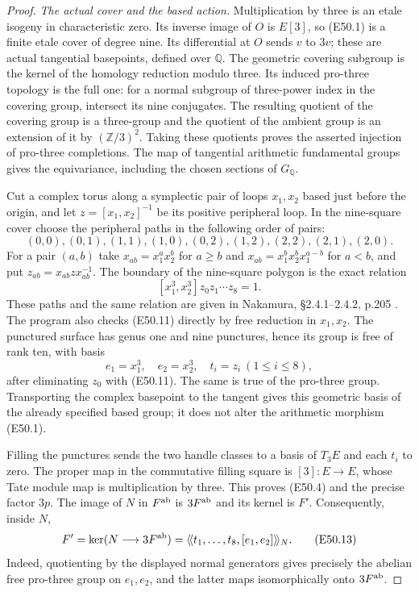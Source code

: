 \begin{proof}
\emph{The actual cover and the based action.}
Multiplication by three is an etale isogeny in
characteristic zero. Its inverse image of $O$
is $E[3]$, so (E50.1) is a finite etale cover
of degree nine. Its differential at $O$ sends
$v$ to $3v$; these are actual tangential
basepoints, defined over $\mathbb Q$. The
geometric covering subgroup is the kernel of
the homology reduction modulo three. Its
induced pro-three topology is the full one:
for a normal subgroup of three-power index in
the covering group, intersect its nine
conjugates. The resulting quotient of the
covering group is a three-group and the
quotient of the ambient group is an extension
of it by $(\mathbb Z/3)^2$. Taking these
quotients proves the asserted injection of
pro-three completions. The map of tangential
arithmetic fundamental groups gives the
equivariance, including the chosen sections
of $G_{\mathbb Q}$.

Cut a complex torus along a symplectic pair of
loops $x_1,x_2$ based just before the origin,
and let $z=[x_1,x_2]^{-1}$ be its positive
peripheral loop. In the nine-square cover
choose the peripheral paths in the following
order of pairs:
\[
 (0,0),(0,1),(1,1),(1,0),(0,2),
 (1,2),(2,2),(2,1),(2,0).
 \tag{E50.10}
\]
For a pair $(a,b)$ take
$x_{ab}=x_1^ax_2^b$ for $a\ge b$ and
$x_{ab}=x_1^bx_2^bx_1^{a-b}$ for $a<b$,
and put $z_{ab}=x_{ab}zx_{ab}^{-1}$.
The boundary of the nine-square polygon is
the exact relation
\[
 [x_1^3,x_2^3]z_0z_1\cdots z_8=1.
 \tag{E50.11}
\]
These paths and the same relation are given
in Nakamura, \S2.4.1--2.4.2, p.205
\cite{A_Nakamura1995}. The program also
checks (E50.11) directly by free reduction
in $x_1,x_2$. The punctured surface has
genus one and nine punctures, hence its
group is free of rank ten, with basis
\[
 e_1=x_1^3,\quad e_2=x_2^3,
 \quad t_i=z_i\ (1\le i\le8),
 \tag{E50.12}
\]
after eliminating $z_0$ with (E50.11).
The same is true of the pro-three group.
Transporting the complex basepoint to the
tangent gives this geometric basis of the
already specified based group; it does not
alter the arithmetic morphism (E50.1).

Filling the punctures sends the two handle
classes to a basis of $T_3E$ and each $t_i$
to zero. The proper map in the commutative
filling square is $[3]:E\to E$, whose Tate
module map is multiplication by three.
This proves (E50.4) and the precise factor
$3p$. The image of $N$ in $F^{\rm ab}$ is
$3F^{\rm ab}$ and its kernel is $F'$.
Consequently, inside $N$,
\[
 F'=\ker(N\longrightarrow3F^{\rm ab})
    =\langle\!\langle t_1,\ldots,t_8,
                   [e_1,e_2]\rangle\!\rangle_N.
 \tag{E50.13}
\]
Indeed, quotienting by the displayed normal
generators gives precisely the abelian free
pro-three group on $e_1,e_2$, and the latter
maps isomorphically onto $3F^{\rm ab}$.


\end{proof}

